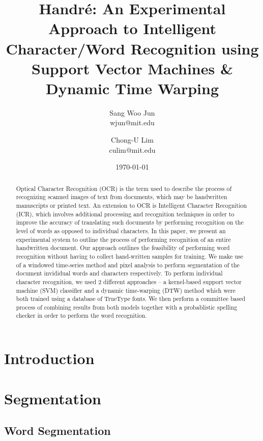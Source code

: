 \documentclass[12pt]{article}
\title{Handr\'{e}: An Experimental Approach to Intelligent Character/Word Recognition using Support Vector Machines \& Dynamic Time Warping}
\date{\today}
\author{
	Sang Woo Jun \\ 
	wjun@mit.edu \\ 
  \and
  Chong-U Lim\\
  culim@mit.edu
}
\begin{document}
\maketitle

\begin{abstract}
	Optical Character Recognition (OCR) is the term used to describe the process of recognizing scanned images of text from documents, which may be handwritten manuscripts or printed text. An extension to OCR is Intelligent Character Recognition (ICR), which involves additional processing and recognition techniques in order to improve the accuracy of translating such documents by performing recognition on the level of words as opposed to individual characters. In this paper, we present an experimental system to outline the process of performing recognition of an entire handwritten document. Our approach outlines the feasibility of performing word recognition without having to collect hand-written samples for training. We make use of a windowed time-series method and pixel analysis to perform segmentation of the document invididual words and characters respectively. To perform individual character recognition, we used 2 different approaches -- a kernel-based support vector machine (SVM) classifier and a dynamic time-warping (DTW) method which were both trained using a database of TrueType fonts. We then perform a committee based process of combining results from both models together with a probablistic spelling checker in order to perform the word recognition. 
\end{abstract}

\newpage
\tableofcontents
\newpage
\section{Introduction}

\section{Segmentation}
\label{section:segmentation}
	\subsection{Word Segmentation}
\end{document}
